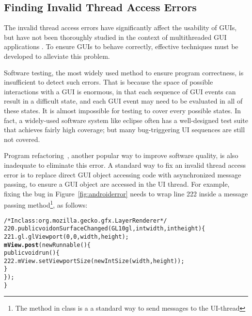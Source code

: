 


\subsection{Finding Invalid Thread Access Errors}

The invalid thread access errors have significantly affect the
usability of GUIs, but have not been thoroughly studied in
the context of multithreaded GUI applications . To ensure GUIs
to behave correctly, effective
techniques must be developed to alleviate this problem.


Software testing, the most widely used method to ensure program correctness,
is insufficient to detect such errors. That is because the space of possible interactions
with a GUI is enormous, in that each sequence of GUI events can result in
a difficult state, and each GUI event may need to be evaluated in all of
these states. It is almost impossible for testing to cover every possible
states. In fact, a widely-used software system like eclipse
often has a well-designed test suite that achieves fairly high coverage; but many
 bug-triggering UI sequences are still not covered.

Program refactoring~\cite{Mens:2004}, another popular way to improve software quality,
is also inadequate to eliminate this error.  A standard way to fix an
invalid thread access error is to replace direct GUI object accessing code 
with asynchronized message passing, to ensure a GUI object are accessed in
the UI thread. For example, fixing the bug in Figure~\ref{fig:androiderror}
needs to wrap line 222 inside a  message passing method\footnote{The
 method in class  is a
a standard way to send messages to the UI-thread}, as follows:


\begin{CodeOut}
\begin{alltt}
     /* In class: org.mozilla.gecko.gfx.LayerRenderer */
220. public void onSurfaceChanged(GL10 gl, int width, int height) \{
221.     gl.glViewport(0, 0, width, height);
         \textbf{mView.post}(new Runnable() \{
             public void run() \{
222.             mView.setViewportSize(new IntSize(width, height));
             \}
         \});
     \}
\end{alltt}
\end{CodeOut}

